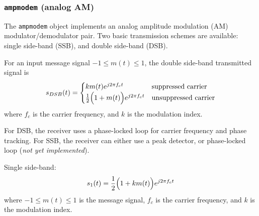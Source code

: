 \subsubsection{{\tt ampmodem} (analog AM)}
\label{module:modem:analog:ampmodem}
The {\tt ampmodem} object implements an analog amplitude modulation (AM)
modulator/demodulator pair.
Two basic transmission schemes are available:
single side-band (SSB), and
double side-band (DSB).

For an input message signal $-1 \le m(t) \le 1$, the double side-band
transmitted signal is
%
\begin{equation}
\label{eqn:modem:ampmodem:dsb_tx}
    s_{DSB}(t) = 
    \begin{cases}
        km(t)e^{j 2 \pi f_c t}   &   \text{suppressed carrier} \\
        \frac{1}{2}\Bigl(1+m(t)\Bigr)e^{j 2 \pi f_c t}   &   \text{unsuppressed carrier}
    \end{cases}
\end{equation}
%
where $f_c$ is the carrier frequency, and $k$ is the modulation index.

For DSB, the receiver uses a phase-locked loop for carrier frequency and
phase tracking.
For SSB, the receiver can either use a peak detector, or phase-locked loop
({\it not yet implemented}).

Single side-band:
\[
    s_1(t) = \frac{1}{2}\Bigl(1+k m(t)\Bigr)e^{j 2 \pi f_c t}
\]
where $-1 \le m(t) \le 1$ is the message signal, $f_c$ is the carrier frequency,
and $k$ is the modulation index.

